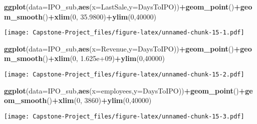 \documentclass[]{article}
\newenvironment{Shaded}{\begin{snugshade}}{\end{snugshade}}
\newcommand{\DataTypeTok}[1]{\textcolor[rgb]{0.13,0.29,0.53}{#1}}
\newcommand{\DecValTok}[1]{\textcolor[rgb]{0.00,0.00,0.81}{#1}}
\newcommand{\FloatTok}[1]{\textcolor[rgb]{0.00,0.00,0.81}{#1}}
\newcommand{\KeywordTok}[1]{\textcolor[rgb]{0.13,0.29,0.53}{\textbf{#1}}}
\newcommand{\NormalTok}[1]{#1}
\newcommand{\OperatorTok}[1]{\textcolor[rgb]{0.81,0.36,0.00}{\textbf{#1}}}
\begin{document}
\begin{Shaded}
\begin{Highlighting}[]
\KeywordTok{ggplot}\NormalTok{(}\DataTypeTok{data=}\NormalTok{IPO_sub,}\KeywordTok{aes}\NormalTok{(}\DataTypeTok{x=}\NormalTok{LastSale,}\DataTypeTok{y=}\NormalTok{DaysToIPO))}\OperatorTok{+}\KeywordTok{geom_point}\NormalTok{()}\OperatorTok{+}\KeywordTok{geom_smooth}\NormalTok{()}\OperatorTok{+}\KeywordTok{xlim}\NormalTok{(}\DecValTok{0}\NormalTok{, }\FloatTok{35.9800}\NormalTok{)}\OperatorTok{+}\KeywordTok{ylim}\NormalTok{(}\DecValTok{0}\NormalTok{,}\DecValTok{40000}\NormalTok{)}
\end{Highlighting}
\end{Shaded}

\texttt{[image: Capstone-Project\_files/figure-latex/unnamed-chunk-15-1.pdf]}

\begin{Shaded}
\begin{Highlighting}[]
\KeywordTok{ggplot}\NormalTok{(}\DataTypeTok{data=}\NormalTok{IPO_sub,}\KeywordTok{aes}\NormalTok{(}\DataTypeTok{x=}\NormalTok{Revenue,}\DataTypeTok{y=}\NormalTok{DaysToIPO))}\OperatorTok{+}\KeywordTok{geom_point}\NormalTok{()}\OperatorTok{+}\KeywordTok{geom_smooth}\NormalTok{()}\OperatorTok{+}\KeywordTok{xlim}\NormalTok{(}\DecValTok{0}\NormalTok{, }\FloatTok{1.625e+09}\NormalTok{)}\OperatorTok{+}\KeywordTok{ylim}\NormalTok{(}\DecValTok{0}\NormalTok{,}\DecValTok{40000}\NormalTok{)}
\end{Highlighting}
\end{Shaded}

\texttt{[image: Capstone-Project\_files/figure-latex/unnamed-chunk-15-2.pdf]}

\begin{Shaded}
\begin{Highlighting}[]
\KeywordTok{ggplot}\NormalTok{(}\DataTypeTok{data=}\NormalTok{IPO_sub,}\KeywordTok{aes}\NormalTok{(}\DataTypeTok{x=}\NormalTok{employees,}\DataTypeTok{y=}\NormalTok{DaysToIPO))}\OperatorTok{+}\KeywordTok{geom_point}\NormalTok{()}\OperatorTok{+}\KeywordTok{geom_smooth}\NormalTok{()}\OperatorTok{+}\KeywordTok{xlim}\NormalTok{(}\DecValTok{0}\NormalTok{, }\DecValTok{3860}\NormalTok{)}\OperatorTok{+}\KeywordTok{ylim}\NormalTok{(}\DecValTok{0}\NormalTok{,}\DecValTok{40000}\NormalTok{)}
\end{Highlighting}
\end{Shaded}

\texttt{[image: Capstone-Project\_files/figure-latex/unnamed-chunk-15-3.pdf]}
\end{document}
